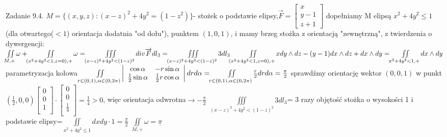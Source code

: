 \documentclass{article}
\begin{document}
Zadanie 9.4.
\newline
\newline
$
M=\{(x,y,z):(x-z)^2+4y^2=(1-z^2)\}$- stożek o podstawie elipsy,$\overrightarrow{F}=\left[\begin{array}{c}x\\y-1\\z+1\end{array}\right]
$\newline
dopełniamy M elipsą $x^2+4y^2\le1$(dla otwartego($<1$) orientacja dodatnia "od dołu"), punktem $(1,0,1)$, i mamy brzeg stożka z orientacją "zewnętrzną",
z twierdzenia o dywergencji:\newline
$
\iint\limits_{M,+}\omega+\iint\limits_{(x^2+4y^2<1,z=0),+}\omega=\iiint\limits_{(x-z)^2+4y^2<(1-z)^2}div\overrightarrow{F}dl_3=\iiint\limits_{(x-z)^2+4y^2<(1-z)^2}3dl_3\newline
\iint\limits_{(x^2+4y^2<1,z=0),+}xdy\wedge dz -(y-1)dx\wedge dz+dx\wedge dy=\iint\limits_{x^2+4y^2<1,+}dx\wedge dy\newline
$ parametryzacja kołowa
$
\iint\limits_{r\in(0,1),\alpha\in(0,2\pi)}\left|\begin{array}{cc}\cos{\alpha}&-r\sin{\alpha}\\\frac{1}{2}\sin{\alpha}&\frac{1}{2}r\cos{\alpha}\end{array}\right|drd\alpha
=\iint\limits_{r\in(0,1),\alpha\in(0,2\pi)}\frac{r}{2}drd\alpha=\frac{\pi}{2}\newline
$ sprawdźmy orientację wektor $(0,0,1)$ w punkt $(\frac{1}{2},0,0)
\left[\begin{array}{c}0\\0\\1\\\end{array}\right]\cdot\left[\begin{array}{c}0\\0\\\frac{1}{4}\\\end{array}\right]=\frac{1}{4}>0
$, więc orientacja odwrotna$\rightarrow-\frac{\pi}{2}$
$
\iiint\limits_{(x-z)^2+4y^2<(1-z)^2}3dl_3$= 3 razy objętość stożka o wysokości 1 i podstawie elipsy=$\iint\limits_{x^2+4y^2\le1}dxdy\cdot 1=\frac{\pi}{2}$\newline
$\iint\limits_{M,+}\omega=\underline{\pi}$
\end{document}
